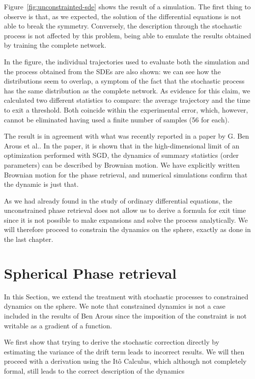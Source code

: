Figure~\ref{fig:unconstrainted-sde} shows the result of a simulation.
The first thing to observe is that, as we expected, the solution of the differential equations is not able to break the symmetry.
Conversely, the description through the stochastic process is not affected by this problem,
being able to emulate the results obtained by training the complete network.

In the figure, the individual trajectories used to evaluate both the simulation and the process obtained from the SDEs are also shown:
we can see how the distributions seem to overlap, a symptom of the fact that the stochastic process has the same distribution as the complete network.
As evidence for this claim, we calculated two different statistics to compare:
the average trajectory and the time to exit a threshold.
Both coincide within the experimental error, which, however, cannot be eliminated having used a finite number of samples (56 for each).

The result is in agreement with what was recently reported in a paper by G. Ben Arous et al.\cite{arous2022high}.
In the paper, it is shown that in the high-dimensional limit of an optimization performed with SGD,
the dynamics of summary statistics (order parameters) can be described by Brownian motion.
We have explicitly written Brownian motion for the phase retrieval, and numerical simulations confirm that the dynamic is just that.

As we had already found in the study of ordinary differential equations,
the unconstrained phase retrieval does not allow us to derive a formula for exit time since it is not possible to make expansions and solve the process analytically.
We will therefore proceed to constrain the dynamics on the sphere, exactly as done in the last chapter.

\section{Spherical Phase retrieval}
In this Section, we extend the treatment with stochastic processes to constrained dynamics on the sphere.
We note that constrained dynamics is not a case included in the results of Ben Arous \cite{arous2022high}
since the imposition of the constraint is not writable as a gradient of a function.

We first show that trying to derive the stochastic correction directly by estimating the variance of the drift term leads to incorrect results. 
We will then proceed with a derivation using the Itô Calculus, which although not completely formal,
still leads to the correct description of the dynamics


